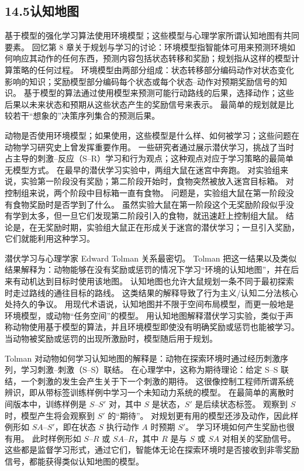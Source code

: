 \documentclass[UTF8,12pt,a4paper,fontset=fandol]{ctexart}
\begin{document}
\subsection*{14.5\quad 认知地图}

基于模型的强化学习算法使用环境模型；这些模型与心理学家所谓认知地图有共同要素。
回忆第 8 章关于规划与学习的讨论：环境模型指智能体可用来预测环境如何响应其动作的任何东西，预测内容包括状态转移和奖励；规划指从这样的模型计算策略的任何过程。
环境模型由两部分组成：状态转移部分编码动作对状态变化影响的知识；奖励模型部分编码每个状态或每个状态--动作对预期奖励信号的知识。
基于模型的算法通过使用模型来预测可能行动路线的后果，选择动作；这些后果以未来状态和预期从这些状态产生的奖励信号来表示。
最简单的规划就是比较若干“想象的”决策序列集合的预测后果。

动物是否使用环境模型；如果使用，这些模型是什么样、如何被学习；这些问题在动物学习研究史上曾发挥重要作用。
一些研究者通过展示潜伏学习，挑战了当时占主导的刺激--反应（S--R）学习和行为观点；这种观点对应于学习策略的最简单无模型方式。
在最早的潜伏学习实验中，两组大鼠在迷宫中奔跑。
对实验组来说，实验第一阶段没有奖励；第二阶段开始时，食物突然被放入迷宫目标箱。
对控制组来说，两个阶段中目标箱一直有食物。
问题是，实验组大鼠在第一阶段没有食物奖励时是否学到了什么。
虽然实验大鼠在第一阶段这个无奖励阶段似乎没有学到太多，但一旦它们发现第二阶段引入的食物，就迅速赶上控制组大鼠。
结论是，在无奖励时期，实验组大鼠正在形成关于迷宫的潜伏学习；一旦引入奖励，它们就能利用这种学习。

潜伏学习与心理学家 Edward Tolman 关系最密切。
Tolman 把这一结果以及类似结果解释为：动物能够在没有奖励或惩罚的情况下学习“环境的认知地图”，并在后来有动机达到目标时使用该地图。
认知地图也允许大鼠规划一条不同于最初探索时走过路线的通往目标的路线。
这类结果的解释导致了行为主义/认知二分法核心处持久的争议。
用现代术语说，认知地图并不限于空间布局模型，而更一般地是环境模型，或动物“任务空间”的模型。
用认知地图解释潜伏学习实验，类似于声称动物使用基于模型的算法，并且环境模型即使没有明确奖励或惩罚也能被学习。
当动物被奖励或惩罚的出现所激励时，模型随后用于规划。

Tolman 对动物如何学习认知地图的解释是：动物在探索环境时通过经历刺激序列，学习刺激--刺激（S--S）联结。
在心理学中，这称为期待理论：给定 S--S 联结，一个刺激的发生会产生关于下一个刺激的期待。
这很像控制工程师所谓系统辨识，即从带标签训练样例中学习一个未知动力系统的模型。
在最简单的离散时间版本中，训练样例是 $S$--$S'$ 对，其中 $S$ 是状态，$S'$ 是后续状态标签。
观察到 $S$ 时，模型产生将会观察到 $S'$ 的“期待”。
对规划更有用的模型还涉及动作，因此样例形如 $SA$--$S'$，即在状态 $S$ 执行动作 $A$ 时预期 $S'$。
学习环境如何产生奖励也很有用。
此时样例形如 $S$--$R$ 或 $SA$--$R$，其中 $R$ 是与 $S$ 或 $SA$ 对相关的奖励信号。
这些都是监督学习形式，通过它们，智能体无论在探索环境时是否接收到非零奖励信号，都能获得类似认知地图的模型。
\end{document}
